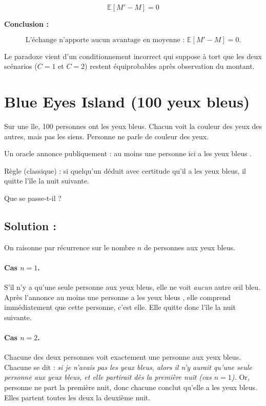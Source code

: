 \[
\boxed{\mathbb{E}[M' - M] = 0}
\]




\textbf{Conclusion :}

\[
\boxed{\text{L'échange n'apporte aucun avantage en moyenne : } \mathbb{E}[M' - M] = 0.}
\]

Le paradoxe vient d'un conditionnement incorrect qui suppose à tort que les deux scénarios ($C=1$ et $C=2$) restent équiprobables après observation du montant.


\section{Blue Eyes Island (100 yeux bleus)}

\begin{exerciseBox}
Sur une île, 100 personnes ont les yeux bleus. Chacun voit la couleur des yeux des autres, mais pas les siens. Personne ne parle de couleur des yeux.

Un oracle annonce publiquement : \og au moins une personne ici a les yeux bleus \fg.

Règle (classique) : si quelqu’un déduit avec certitude qu’il a les yeux bleus, il quitte l’île la nuit suivante.

Que se passe-t-il ?
\end{exerciseBox}

\subsection*{Solution :}

On raisonne par récurrence sur le nombre $n$ de personnes aux yeux bleus.

\paragraph{Cas $n=1$.}
S'il n'y a qu'une seule personne aux yeux bleus, elle ne voit \emph{aucun} autre œil bleu. Après l'annonce \og au moins une personne a les yeux bleus \fg, elle comprend immédiatement que cette personne, c'est elle. Elle quitte donc l'île la nuit suivante.

\paragraph{Cas $n=2$.}
Chacune des deux personnes voit exactement une personne aux yeux bleus.
Chacune se dit : \emph{si je n'avais pas les yeux bleus, alors il n'y aurait qu'une seule personne aux yeux bleus, et elle partirait dès la première nuit (cas $n=1$).}
Or, personne ne part la première nuit, donc chacune conclut qu'elle a les yeux bleus. Elles partent toutes les deux la deuxième nuit.

